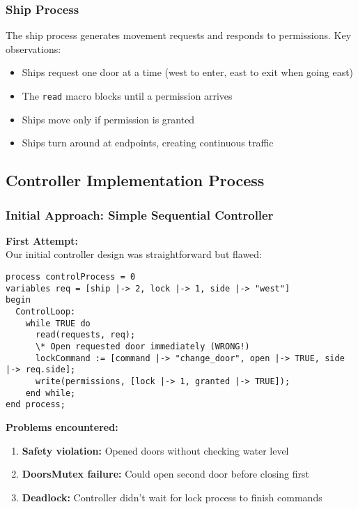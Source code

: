 \documentclass[12pt,a4paper]{article}
\begin{document}
\subsubsection{Ship Process}

The ship process generates movement requests and responds to permissions. Key observations:
\begin{itemize}
    \item Ships request one door at a time (west to enter, east to exit when going east)
    \item The \texttt{read} macro blocks until a permission arrives
    \item Ships move only if permission is granted
    \item Ships turn around at endpoints, creating continuous traffic
\end{itemize}

\subsection{Controller Implementation Process}

\subsubsection{Initial Approach: Simple Sequential Controller}

\textbf{First Attempt:}\\
Our initial controller design was straightforward but flawed:

\begin{lstlisting}[style=tlaplus]
process controlProcess = 0
variables req = [ship |-> 2, lock |-> 1, side |-> "west"]
begin
  ControlLoop:
    while TRUE do
      read(requests, req);
      \* Open requested door immediately (WRONG!)
      lockCommand := [command |-> "change_door", open |-> TRUE, side |-> req.side];
      write(permissions, [lock |-> 1, granted |-> TRUE]);
    end while;
end process;
\end{lstlisting}

\textbf{Problems encountered:}
\begin{enumerate}
    \item \textbf{Safety violation:} Opened doors without checking water level
    \item \textbf{DoorsMutex failure:} Could open second door before closing first
    \item \textbf{Deadlock:} Controller didn't wait for lock process to finish commands
\end{enumerate}
\end{document}
